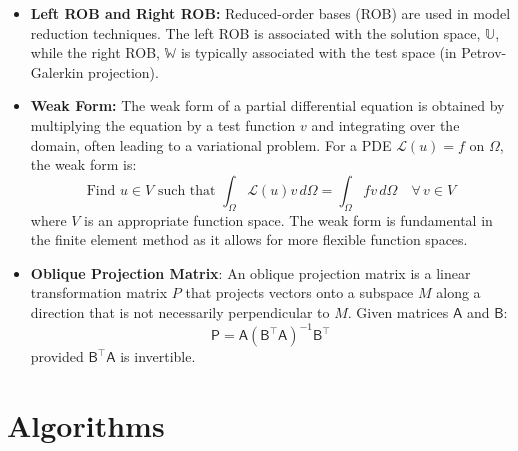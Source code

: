\documentclass[11pt]{article}
\newcommand{\mat}[1]{\mathsf{#1}}
\begin{document}
\begin{itemize}
                    \item \textbf{Left ROB and Right ROB:} Reduced-order bases (ROB) are used in model reduction techniques. The left ROB is associated with the solution space, ${\mathbb{U}}$, while the right ROB, ${\mathbb{W}}$ is typically associated with the test space (in Petrov-Galerkin projection).

                    \item \textbf{Weak Form:} The weak form of a partial differential equation is obtained by multiplying the equation by a test function \( v \) and integrating over the domain, often leading to a variational problem. For a PDE \( \mathcal{L}(u) = f \) on \( \Omega \), the weak form is:
                    \[
                    \text{Find } u \in V \text{ such that } \int_\Omega \mathcal{L}(u) v \, d\Omega = \int_\Omega f v \, d\Omega \quad \forall \, v \in V
                    \]
                    where \( V \) is an appropriate function space. The weak form is fundamental in the finite element method as it allows for more flexible function spaces.

                    \item \textbf{Oblique Projection Matrix}: An oblique projection matrix is a linear transformation matrix \( P \) that projects vectors onto a subspace \( M \) along a direction that is not necessarily perpendicular to \( M \). Given matrices \( \mat{A} \) and \( \mat{B} \):
                    \[
                    \mat{P} = \mat{A} (\mat{B}^\top \mat{A})^{-1} \mat{B}^\top
                    \]
                    provided \( \mat{B}^\top \mat{A} \) is invertible.
            \end{itemize}

            \section{Algorithms}
            \label{sec:algorithms}
\end{document}
